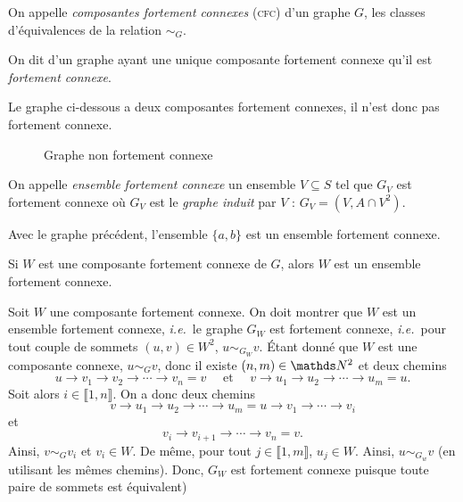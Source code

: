\begin{defn}
	On appelle \textit{composantes fortement connexes} (\textsc{cfc}) d'un graphe $G$, les classes d'équivalences de la relation $\sim_G$.
\end{defn}

\begin{defn}
	On dit d'un graphe ayant une unique composante fortement connexe qu'il est \textit{fortement connexe}.
\end{defn}

\begin{exm}
	Le graphe ci-dessous a deux composantes fortement connexes, il n'est donc pas fortement connexe.
	\begin{figure}[H]
		\centering
		\caption{Graphe non fortement connexe}
	\end{figure}
\end{exm}

\begin{defn}
	On appelle \textit{ensemble fortement connexe} un ensemble $V \subseteq S$\/ tel que $G_V$\/ est fortement connexe où $G_V$\/ est le \textit{graphe induit} par $V$\/ : $G_V = (V, A \cap V^2)$.
\end{defn}

\begin{exm}
	Avec le graphe précédent, l'ensemble $\{a,b\}$\/ est un ensemble fortement connexe.
\end{exm}

\begin{lem}
	Si $W$\/ est une composante fortement connexe de $G$, alors $W$\/ est un ensemble fortement connexe.
\end{lem}

\begin{prv}
	Soit $W$\/ une composante fortement connexe. On doit montrer que $W$\/ est un ensemble fortement connexe, \textit{i.e.}\ le graphe $G_W$\/ est fortement connexe, \textit{i.e.}\ pour tout couple de sommets $(u,v) \in W^2$, $u \sim_{G_W} v$.
	Étant donné que $W$\/ est une composante connexe, $u \sim_G v$, donc il existe $(n,m) \in \N^2$\/ et deux chemins \[
		u \to v_1 \to v_2 \to \cdots \to v_n = v \quad \text{ et }\quad 
		v \to u_1 \to u_2 \to \cdots \to u_m = u
	.\]
	Soit alors $i \in \llbracket 1,n \rrbracket$. On a donc deux chemins
	\[
		v \to u_1 \to u_2 \to \cdots \to u_m = u \to v_1 \to \cdots \to v_i
	\] et \[
		v_i \to v_{i+1} \to \cdots \to v_n = v
	.\] Ainsi, $v \sim_G v_i$\/ et $v_i \in W$.
	De même, pour tout $j \in \llbracket 1,m \rrbracket$, $u_j \in W$.
	Ainsi, $u \sim_{G_w} v$\/ (en utilisant les mêmes chemins). Donc, $G_W$\/ est fortement connexe puisque toute paire de sommets est équivalent)
\end{prv}

